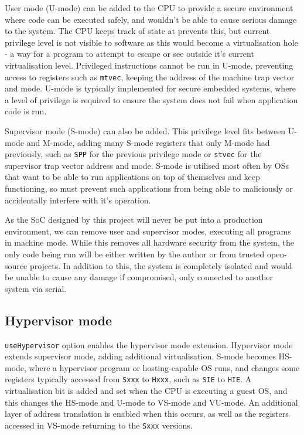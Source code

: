 User mode (U-mode) can be added to the CPU to provide a secure environment where code can be executed safely, and wouldn't be able to cause serious damage to the system. The CPU keeps track of state at prevents this, but current privilege level is not visible to software as this would become a virtualisation hole - a way for a program to attempt to escape or see outside it's current virtualisation level. Privileged instructions cannot be run in U-mode, preventing access to registers such as \texttt{mtvec}, keeping the address of the machine trap vector and mode. U-mode is typically implemented for secure embedded systems, where a level of privilege is required to ensure the system does not fail when application code is run.

Supervisor mode (S-mode) can also be added. This privilege level fits between U-mode and M-mode, adding many S-mode registers that only M-mode had previously, such as \texttt{SPP} for the previous privilege mode or \texttt{stvec} for the supervisor trap vector address and mode. S-mode is utilised most often by OSs that want to be able to run applications on top of themselves and keep functioning, so must prevent such applications from being able to maliciously or accidentally interfere with it's operation.

As the SoC designed by this project will never be put into a production environment, we can remove user and supervisor modes, executing all programs in machine mode. While this removes all hardware security from the system, the only code being run will be either written by the author or from trusted open-source projects. In addition to this, the system is completely isolated and would be unable to cause any damage if compromised, only connected to another system via serial.

\subsection{Hypervisor mode}
\texttt{useHypervisor} option enables the hypervisor mode extension. Hypervisor mode extends supervisor mode, adding additional virtualisation. S-mode becomes HS-mode, where a hypervisor program or hosting-capable OS runs, and changes some registers typically accessed from \texttt{Sxxx} to \texttt{Hxxx}, such as \texttt{SIE} to \texttt{HIE}. A virtualisation bit is added and set when the CPU is executing a guest OS, and this changes the HS-mode and U-mode to VS-mode and VU-mode. An additional layer of address translation is enabled when this occurs, as well as the registers accessed in VS-mode returning to the \texttt{Sxxx} versions.

